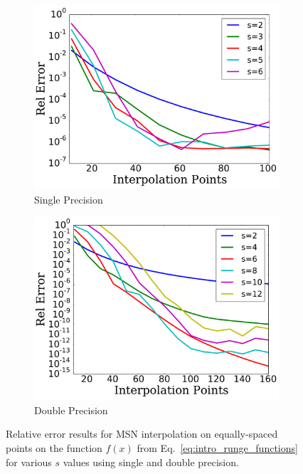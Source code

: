 \begin{figure}
\centering
    \begin{subfigure}{0.45\textwidth}
    \includegraphics[width=\textwidth]{plots/msn_interp_1d_single_runge.pdf}
    \caption{Single Precision}
    \end{subfigure}
    \begin{subfigure}{0.45\textwidth}
    \includegraphics[width=\textwidth]{plots/msn_interp_1d_double_runge.pdf}
    \caption{Double Precision}
    \end{subfigure}
\caption[MSN 1D Interpolation Relative Error]{
Relative error results for MSN interpolation on equally-spaced points
on the function $f(x)$ from Eq.~\eqref{eq:intro_runge_functions}
for various $s$ values using single and double precision.}
\label{fig:intro_msn_interp}
\end{figure}

